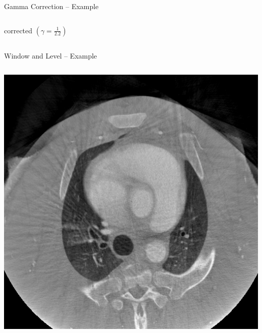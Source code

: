 \begin{frame}[c]{Gamma Correction -- Example}
\begin{columns}[onlytextwidth]
\begin{column}{0.30\textwidth}
            corrected $(\gamma=\frac{1}{2.2})$
        \end{column}
    \end{columns}
\end{frame}

\begin{frame}{Window and Level -- Example}
    \begin{columns}[T, onlytextwidth]
        \begin{column}{0.5\textwidth}\centering
            \includegraphics[height=0.75\textheight]{img/m1000-1000HU}


\end{column}
\end{columns}
\end{frame}
